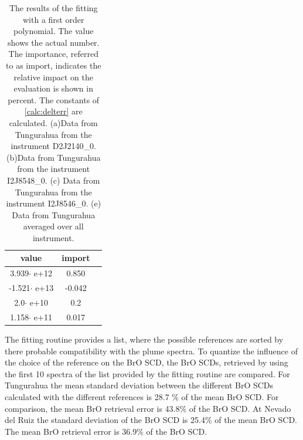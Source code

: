 \documentclass  [
  paper    = a4,
  BCOR     = 10mm,
  twoside,
  fontsize = 12pt,
  fleqn,
  toc      = bibnumbered,
  toc      = listofnumbered,
  numbers  = noendperiod,
  headings = normal,
  listof   = leveldown,
  version  = 3.03
]                                       {scrreprt}
\begin{document}
\begin{table}[h!]
{\begin{tabular}{c|c|c}
			\toprule
			value & import \\
			\toprule
			3.939$\cdot$ e+12&0.850\\
			\midrule
			-1.521$\cdot$ e+13&-0.042\\
			\midrule
			2.0$\cdot$ e+10&0.2 \\
			\midrule
			1.158$\cdot$ e+11&0.017\\
			\midrule
			\bottomrule
	\end{tabular}}
\centering
		\label{tab:coefTung}
		\caption{The results of the fitting with a first order polynomial. The value shows the actual number. The importance,  referred to as
			import,  indicates the relative impact on the evaluation is shown in percent.
			The constants of \cref{calc:delterr} are calculated.
			(a)Data from Tungurahua  from the instrument D2J2140\_0.  
			(b)Data from Tungurahua from the  instrument I2J8548\_0. %
			(c) Data from Tungurahua from the  instrument I2J8546\_0. (e)  Data from Tungurahua averaged over all instrument.  %
		 }
	\end{table}			
	The fitting routine provides a list, where the possible references are sorted by there probable compatibility with the plume spectra. To quantize the influence of the choice of the reference on the BrO SCD, the BrO SCDs, retrieved by using the first 10 spectra of the list provided by the fitting routine are compared.
	For Tungurahua the mean standard deviation between the different BrO SCDs calculated with the different references is 28.7 \% of the mean BrO SCD. For comparison, the mean BrO retrieval error is 43.8\% of the BrO SCD.
	At Nevado del Ruiz the standard deviation of the BrO SCD is 25.4\% of the mean BrO SCD. The mean BrO retrieval error is 36.9\% of the BrO SCD.\\
\end{document}
